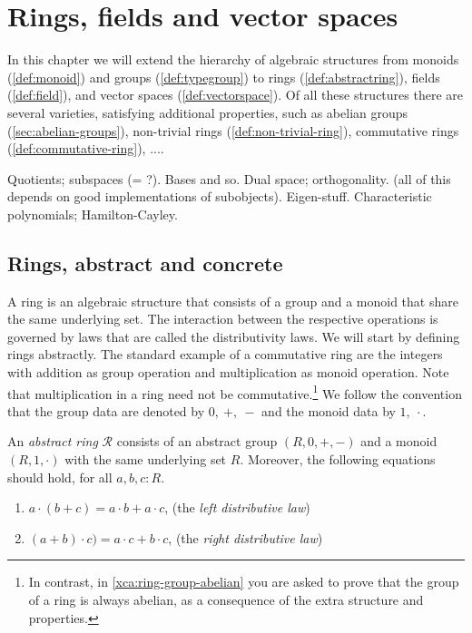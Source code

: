 \chapter{Rings, fields and vector spaces}
\label{ch:fields}

In this chapter we will extend the hierarchy of algebraic structures from 
monoids (\cref{def:monoid}) and 
groups (\cref{def:typegroup}) to
rings (\cref{def:abstractring}),
fields (\cref{def:field}), and
vector spaces (\cref{def:vectorspace}).
Of all these structures there are several varieties, 
satisfying additional properties, such as 
abelian groups (\cref{sec:abelian-groups}),
non-trivial rings (\cref{def:non-trivial-ring}),
commutative rings (\cref{def:commutative-ring}),
....

Quotients; subspaces (= ?). Bases and so. Dual space; orthogonality. (all of this depends on good implementations of subobjects). Eigen-stuff. Characteristic polynomials; Hamilton-Cayley.

\section{Rings, abstract and concrete}

A ring is an algebraic structure that consists of a group and a
monoid that share the same underlying set. The interaction between
the respective operations is governed by laws that are called
the distributivity laws. We will start by defining rings abstractly.
The standard example of a commutative ring are the integers with addition as
group operation and multiplication as monoid operation.
Note that multiplication in a ring need not be commutative.\footnote{%
In contrast, in \cref{xca:ring-group-abelian} you are asked to prove
that the group of a ring is always abelian, as a consequence of the
extra structure and properties.} 
We follow the convention that the group data are denoted
by $0,\ +,\ -$ and the monoid data by $1,\ \cdot$.

\begin{definition}\label{def:abstractring}
An \emph{abstract ring} $\mathscr R$ consists of an abstract group 
$(R,0,+,-)$ and a monoid $(R,1,\cdot)$ with the
same underlying set $R$. Moreover, the following equations should hold,
for all $a,b,c : R$.
    \begin{enumerate}[ref=\ref{def:abstractring} (\alph*)]
    \item\label{ring:ldistr-law} $a \cdot (b + c) = a \cdot b + a \cdot c$, (the \emph{left distributive law})
    \item\label{ring:rdistr-law} $(a + b) \cdot  c) = a \cdot c + b \cdot c$, (the \emph{right distributive law})\qedhere
    \end{enumerate}
\end{definition}

